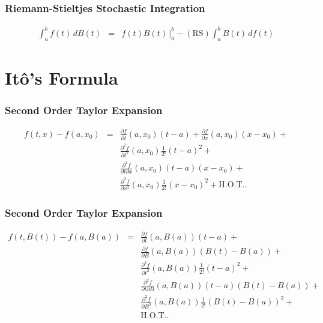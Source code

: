 \documentclass{beamer}   %
\begin{document}
\begin{frame}
    \frametitle{Riemann-Stieltjes Stochastic Integration}
	\begin{eqnarray*}
		\int^b_a  f(t) \, dB(t) &=&  f(t)B(t) \, \bigg|_{a}^{b} -  \left( \mathrm{RS} \right) 			\int^b_a B(t)\,df(t)		
	\end{eqnarray*}

\end{frame}









\section{It\^{o}'s Formula}

\begin{frame}
    \frametitle{Second Order Taylor Expansion}
	\begin{eqnarray}
		f(t,x)-f(a,x_{0}) &=& \frac{\partial f}{\partial t}(a,x_{0})(t-a) + \frac{\partial f}{\partial x}(a,x_{0})(x-x_{0}) +\nonumber \\  
		&& \frac{\partial^{2}f}{\partial t^2}(a,x_{0})\frac{1}{2!}(t-a)^{2} +\nonumber \\  
		&&\frac{\partial^{2}f}{\partial t \partial x}(a,x_{0})(t-a)(x-x_{0}) +\nonumber \\  
		&&\frac{\partial^{2}f}{\partial x^{2}}(a,x_{0})\frac{1}{2!}(x-x_{0})^{2}+\mathrm{H.O.T.}.
	\end{eqnarray}

\end{frame}

\begin{frame}
    \frametitle{Second Order Taylor Expansion}
	\begin{eqnarray}
		f(t,B(t))-f(a,B(a)) &=& \frac{\partial f}{\partial t}(a,B(a))(t-a) + \nonumber \\ 
		&&\frac{\partial f}{\partial B}(a,B(a))(B(t)-B(a)) +\nonumber \\  
		&& \frac{\partial^{2}f}{\partial t^2}(a,B(a))\frac{1}{2!}(t-a)^{2} +\nonumber \\  
		&&\frac{\partial^{2}f}{\partial t \partial B}(a,B(a))(t-a)(B(t)-B(a)) +\nonumber \\  
		&&\frac{\partial^{2}f}{\partial B^{2}}(a,B(a))\frac{1}{2!}(B(t)-B(a))^{2}+\nonumber \\ 
		&&\mathrm{H.O.T.}.
	\end{eqnarray}

\end{frame}
\end{document}
